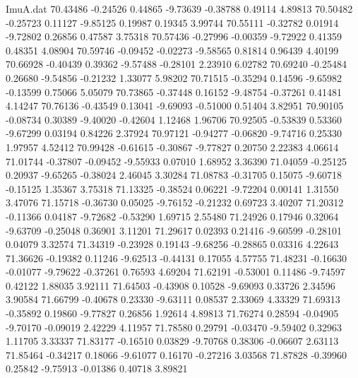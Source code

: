 \begin{filecontents}{ImuA.dat}
  70.43486   -0.24526    0.44865   -9.73639   -0.38788    0.49114    4.89813
  70.50482   -0.25723    0.11127   -9.85125    0.19987    0.19345    3.99744
  70.55111   -0.32782    0.01914   -9.72802    0.26856    0.47587    3.75318
  70.57436   -0.27996   -0.00359   -9.72922    0.41359    0.48351    4.08904
  70.59746   -0.09452   -0.02273   -9.58565    0.81814    0.96439    4.40199
  70.66928   -0.40439    0.39362   -9.57488   -0.28101    2.23910    6.02782
  70.69240   -0.25484    0.26680   -9.54856   -0.21232    1.33077    5.98202
  70.71515   -0.35294    0.14596   -9.65982   -0.13599    0.75066    5.05079
  70.73865   -0.37448    0.16152   -9.48754   -0.37261    0.41481    4.14247
  70.76136   -0.43549    0.13041   -9.69093   -0.51000    0.51404    3.82951
  70.90105   -0.08734    0.30389   -9.40020   -0.42604    1.12468    1.96706
  70.92505   -0.53839    0.53360   -9.67299    0.03194    0.84226    2.37924
  70.97121   -0.94277   -0.06820   -9.74716    0.25330    1.97957    4.52412
  70.99428   -0.61615   -0.30867   -9.77827    0.20750    2.22383    4.06614
  71.01744   -0.37807   -0.09452   -9.55933    0.07010    1.68952    3.36390
  71.04059   -0.25125    0.20937   -9.65265   -0.38024    2.46045    3.30284
  71.08783   -0.31705    0.15075   -9.60718   -0.15125    1.35367    3.75318
  71.13325   -0.38524    0.06221   -9.72204    0.00141    1.31550    3.47076
  71.15718   -0.36730    0.05025   -9.76152   -0.21232    0.69723    3.40207
  71.20312   -0.11366    0.04187   -9.72682   -0.53290    1.69715    2.55480
  71.24926    0.17946    0.32064   -9.63709   -0.25048    0.36901    3.11201
  71.29617    0.02393    0.21416   -9.60599   -0.28101    0.04079    3.32574
  71.34319   -0.23928    0.19143   -9.68256   -0.28865    0.03316    4.22643
  71.36626   -0.19382    0.11246   -9.62513   -0.44131    0.17055    4.57755
  71.48231   -0.16630   -0.01077   -9.79622   -0.37261    0.76593    4.69204
  71.62191   -0.53001    0.11486   -9.74597    0.42122    1.88035    3.92111
  71.64503   -0.43908    0.10528   -9.69093    0.33726    2.34596    3.90584
  71.66799   -0.40678    0.23330   -9.63111    0.08537    2.33069    4.33329
  71.69313   -0.35892    0.19860   -9.77827    0.26856    1.92614    4.89813
  71.76274    0.28594   -0.04905   -9.70170   -0.09019    2.42229    4.11957
  71.78580    0.29791   -0.03470   -9.59402    0.32963    1.11705    3.33337
  71.83177   -0.16510    0.03829   -9.70768    0.38306   -0.06607    2.63113
  71.85464   -0.34217    0.18066   -9.61077    0.16170   -0.27216    3.03568
  71.87828   -0.39960    0.25842   -9.75913   -0.01386    0.40718    3.89821

\end{filecontents}
